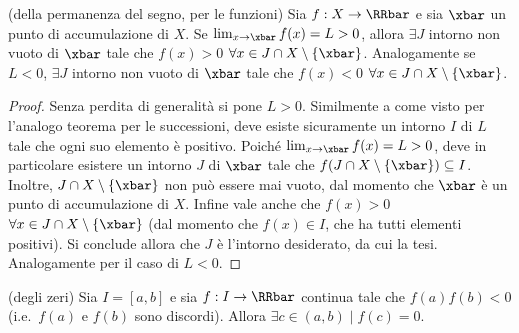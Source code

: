 \documentclass[11pt]{article}
\begin{document}
	\begin{theorem} (della permanenza del segno, per le funzioni)
		Sia $f : X \to \RRbar$ e sia $\xbar$ un punto di accumulazione di $X$. Se $\lim_{x \to \xbar} f(x) = L > 0$,
		allora $\exists J$ intorno non vuoto di $\xbar$ tale che $f(x) > 0$ $\forall x \in J \cap X \setminus \{\xbar\}$.
		Analogamente se $L < 0$, $\exists J$ intorno non vuoto di $\xbar$ tale che $f(x) < 0$ $\forall x \in J \cap X \setminus \{\xbar\}$.
	\end{theorem}

	\begin{proof}
		Senza perdita di generalità si pone $L > 0$.
		Similmente a come visto per l'analogo teorema per le successioni, deve esiste sicuramente un intorno $I$ di $L$ tale che ogni suo elemento è positivo. Poiché $\lim_{x \to \xbar} f(x) = L > 0$, deve in particolare esistere un intorno $J$ di
		$\xbar$ tale che $f(J \cap X \setminus \{\xbar\}) \subseteq I$. Inoltre, $J \cap X \setminus \{\xbar\}$ non può
		essere mai vuoto, dal momento che $\xbar$ è un punto di accumulazione di $X$. Infine vale anche che $f(x) > 0$ $\forall x \in J \cap X \setminus \{\xbar\}$ (dal momento che $f(x) \in I$, che ha tutti elementi positivi).
		Si conclude allora che $J$ è l'intorno desiderato, da cui la tesi. Analogamente per il caso di $L < 0$.
	\end{proof}
	
	\begin{theorem} (degli zeri) Sia $I = [a, b]$ e sia
		$f : I \to \RRbar$ continua tale che $f(a) f(b) < 0$ (i.e.~$f(a)$ e $f(b)$ sono discordi). Allora $\exists c \in (a, b) \mid f(c) = 0$.
	\end{theorem}
\end{document}
